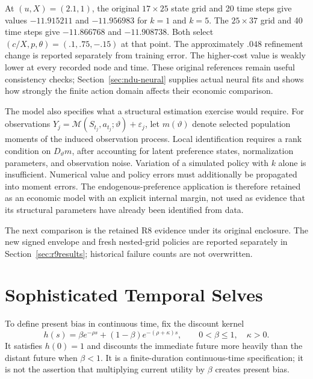 At $(u,X)=(2.1,1)$, the original $17\times25$ state grid and 20 time steps give values $-11.915211$ and $-11.956983$ for $k=1$ and $k=5$. The $25\times37$ grid and 40 time steps give $-11.866768$ and $-11.908738$. Both select $(c/X,p,\theta)=(.1,.75,-.15)$ at that point. The approximately $.048$ refinement change is reported separately from training error. The higher-cost value is weakly lower at every recorded node and time. These original references remain useful consistency checks; Section~\ref{sec:ndu-neural} supplies actual neural fits and shows how strongly the finite action domain affects their economic comparison.

The model also specifies what a structural estimation exercise would require. For observations $Y_j=\mathcal M(S_{t_j},a_{t_j};\vartheta)+\varepsilon_j$, let $m(\vartheta)$ denote selected population moments of the induced observation process. Local identification requires a rank condition on $D_\vartheta m$, after accounting for latent preference states, normalization parameters, and observation noise. Variation of a simulated policy with $k$ alone is insufficient. Numerical value and policy errors must additionally be propagated into moment errors. The endogenous-preference application is therefore retained as an economic model with an explicit internal margin, not used as evidence that its structural parameters have already been identified from data.

The next comparison is the retained R8 evidence under its original enclosure. The new signed envelope and fresh nested-grid policies are reported separately in Section~\ref{sec:r9results}; historical failure counts are not overwritten.


\section{Sophisticated Temporal Selves}\label{sec:temporal}
To define present bias in continuous time, fix the discount kernel
\begin{equation}\label{eq:kernel}
 h(s)=\beta e^{-\rho s}+(1-\beta)e^{-(\rho+\kappa)s},
 \qquad 0<\beta\leq1,\quad\kappa>0.
\end{equation}
It satisfies $h(0)=1$ and discounts the immediate future more heavily than the distant future when $\beta<1$. It is a finite-duration continuous-time specification; it is not the assertion that multiplying current utility by $\beta$ creates present bias.

